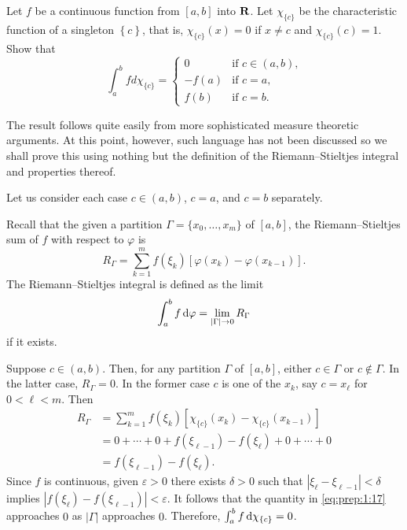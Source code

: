 \begin{problem}
  Let $f$ be a continuous function from $[a,b]$ into $\mathbf{R}$. Let
  $\chi_{\{c\}}$ be the characteristic function of a singleton
  $\left\{c\right\}$, that is, $\chi_{\{c\}}(x)=0$ if $x\neq c$ and
  $\chi_{\{c\}}(c)=1$. Show that
  \[
    \int_a^b f d \chi_{\{c\}}=
    \begin{cases}
      0&\text{if $c\in(a,b)$,}\\
      -f(a)&\text{if $c=a$,}\\
      f(b)&\text{if $c=b$.}
    \end{cases}
  \]
\end{problem}
\begin{solution}
  The result follows quite easily from more sophisticated measure theoretic
  arguments. At this point, however, such language has not been discussed
  so we shall prove this using nothing but the definition of the
  Riemann--Stieltjes integral and properties thereof.

  Let us consider each case $c\in(a,b)$, $c=a$, and $c=b$ separately.

  Recall that the given a partition $\Gamma=\{x_0,\dotsc,x_m\}$ of $[a,b]$,
  the Riemann--Stieltjes sum of $f$ with respect to $\varphi$ is
  \begin{equation}
    \label{eq:prep:1:15}
    R_\Gamma=\sum_{k=1}^mf(\xi_k)[\varphi(x_k)-\varphi(x_{k-1})].
  \end{equation}
  The Riemann--Stieltjes integral is defined as the limit
  \begin{equation}
    \label{eq:prep:1:16}
    \int_a^b f\mathop{}\!\mathrm{d}\varphi=\lim_{|\Gamma|\to 0} R_\Gamma
  \end{equation}
  if it exists.

  Suppose $c\in(a,b)$. Then, for any partition $\Gamma$ of $[a,b]$, either
  $c\in\Gamma$ or $c\notin\Gamma$. In the latter case, $R_\Gamma=0$. In the
  former case $c$ is one of the $x_k$, say $c=x_\ell$ for $0<\ell<m$. Then
  \begin{equation}
    \label{eq:prep:1:17}
    \begin{aligned}
      R_\Gamma&=\sum_{k=1}^mf(\xi_k)[\chi_{\{c\}}(x_k)-\chi_{\{c\}}(x_{k-1})]\\
      &=0+\dotsb+0+f(\xi_{\ell-1})-f(\xi_\ell)+0+\dotsb+0\\
      &=f(\xi_{\ell-1})-f(\xi_\ell).
    \end{aligned}
  \end{equation}
  Since $f$ is continuous, given $\varepsilon>0$ there exists $\delta>0$
  such that $|\xi_\ell-\xi_{\ell-1}|<\delta$ implies
  $|f(\xi_{\ell})-f(\xi_{\ell-1})|<\varepsilon$. It follows that the
  quantity in \eqref{eq:prep:1:17} approaches $0$ as $|\Gamma|$ approaches
  $0$. Therefore, $\int_a^b f\mathop{}\!\mathrm{d}\chi_{\{c\}}=0$.


\end{solution}
